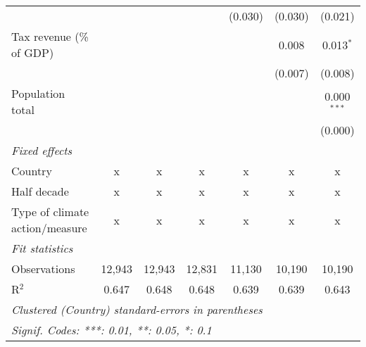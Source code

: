 \begin{tabular}{lcccccc}
                                                          &               &               &              & (0.030) & (0.030) & (0.021)\\   
   Tax revenue (\% of GDP)                                &               &               &              &         & 0.008   & 0.013$^{*}$\\   
                                                          &               &               &              &         & (0.007) & (0.008)\\   
   Population total                                       &               &               &              &         &         & 0.000$^{***}$\\   
                                                          &               &               &              &         &         & (0.000)\\   
   \emph{Fixed effects}\\
   Country                                                & x             & x             & x            & x       & x       & x\\  
   Half decade                                            & x             & x             & x            & x       & x       & x\\  
   Type of climate action/measure                         & x             & x             & x            & x       & x       & x\\  
   \midrule \emph{Fit statistics}\\
   Observations                                           & 12,943        & 12,943        & 12,831       & 11,130  & 10,190  & 10,190\\  
   R$^2$                                                  & 0.647         & 0.648         & 0.648        & 0.639   & 0.639   & 0.643\\  
   \midrule
   \multicolumn{7}{l}{\emph{Clustered (Country) standard-errors in parentheses}}\\
   \multicolumn{7}{l}{\emph{Signif. Codes: ***: 0.01, **: 0.05, *: 0.1}}\\
\end{tabular}
\par\endgroup


